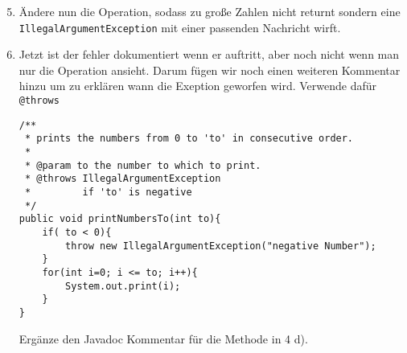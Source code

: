 \begin{enumerate}\setcounter{enumi}{4}
	\item
		Ändere nun die Operation, sodass zu große Zahlen nicht returnt sondern eine \lstinline{IllegalArgumentException} mit einer passenden Nachricht wirft.

	\item
		Jetzt ist der fehler dokumentiert wenn er auftritt, aber noch nicht wenn man nur die Operation ansieht. 
		Darum fügen wir noch einen weiteren Kommentar hinzu um zu erklären wann die Exeption geworfen wird. 
		Verwende dafür \lstinline{@throws}

		\begin{lstlisting}
/**
 * prints the numbers from 0 to 'to' in consecutive order.
 * 
 * @param to the number to which to print.
 * @throws IllegalArgumentException
 *         if 'to' is negative
 */
public void printNumbersTo(int to){
    if( to < 0){
        throw new IllegalArgumentException("negative Number");	
    }
    for(int i=0; i <= to; i++){
        System.out.print(i);
    }
}
		\end{lstlisting}

		Ergänze den Javadoc Kommentar für die Methode in 4 d).
\end{enumerate}
\newpage
